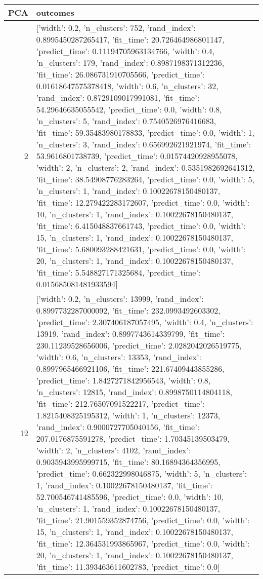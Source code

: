 \begin{tabular}{rl}
\toprule
PCA & outcomes \\
\midrule
2 & [{'width': 0.2, 'n_clusters': 752, 'rand_index': 0.8995450287265417, 'fit_time': 20.726464986801147, 'predict_time': 0.11194705963134766}, {'width': 0.4, 'n_clusters': 179, 'rand_index': 0.8987198371312236, 'fit_time': 26.086731910705566, 'predict_time': 0.01618647575378418}, {'width': 0.6, 'n_clusters': 32, 'rand_index': 0.8729109017991081, 'fit_time': 54.29646635055542, 'predict_time': 0.0}, {'width': 0.8, 'n_clusters': 5, 'rand_index': 0.7540526976416683, 'fit_time': 59.35483980178833, 'predict_time': 0.0}, {'width': 1, 'n_clusters': 3, 'rand_index': 0.656992621921974, 'fit_time': 53.9616801738739, 'predict_time': 0.01574420928955078}, {'width': 2, 'n_clusters': 2, 'rand_index': 0.5351982692641312, 'fit_time': 38.54908776283264, 'predict_time': 0.0}, {'width': 5, 'n_clusters': 1, 'rand_index': 0.10022678150480137, 'fit_time': 12.279422283172607, 'predict_time': 0.0}, {'width': 10, 'n_clusters': 1, 'rand_index': 0.10022678150480137, 'fit_time': 6.415048837661743, 'predict_time': 0.0}, {'width': 15, 'n_clusters': 1, 'rand_index': 0.10022678150480137, 'fit_time': 5.680093288421631, 'predict_time': 0.0}, {'width': 20, 'n_clusters': 1, 'rand_index': 0.10022678150480137, 'fit_time': 5.548827171325684, 'predict_time': 0.015685081481933594}] \\
12 & [{'width': 0.2, 'n_clusters': 13999, 'rand_index': 0.8997732287000092, 'fit_time': 232.0993492603302, 'predict_time': 2.307406187057495}, {'width': 0.4, 'n_clusters': 13919, 'rand_index': 0.8997743614339799, 'fit_time': 230.11239528656006, 'predict_time': 2.0282042026519775}, {'width': 0.6, 'n_clusters': 13353, 'rand_index': 0.8997965466921106, 'fit_time': 221.67409443855286, 'predict_time': 1.8427271842956543}, {'width': 0.8, 'n_clusters': 12815, 'rand_index': 0.8998750114804118, 'fit_time': 212.76507091522217, 'predict_time': 1.8215408325195312}, {'width': 1, 'n_clusters': 12373, 'rand_index': 0.9000727705040156, 'fit_time': 207.0176875591278, 'predict_time': 1.70345139503479}, {'width': 2, 'n_clusters': 4102, 'rand_index': 0.9035943995999715, 'fit_time': 80.16894364356995, 'predict_time': 0.662322998046875}, {'width': 5, 'n_clusters': 1, 'rand_index': 0.10022678150480137, 'fit_time': 52.700546741485596, 'predict_time': 0.0}, {'width': 10, 'n_clusters': 1, 'rand_index': 0.10022678150480137, 'fit_time': 21.901559352874756, 'predict_time': 0.0}, {'width': 15, 'n_clusters': 1, 'rand_index': 0.10022678150480137, 'fit_time': 12.364531993865967, 'predict_time': 0.0}, {'width': 20, 'n_clusters': 1, 'rand_index': 0.10022678150480137, 'fit_time': 11.393463611602783, 'predict_time': 0.0}] \\

\end{tabular}
